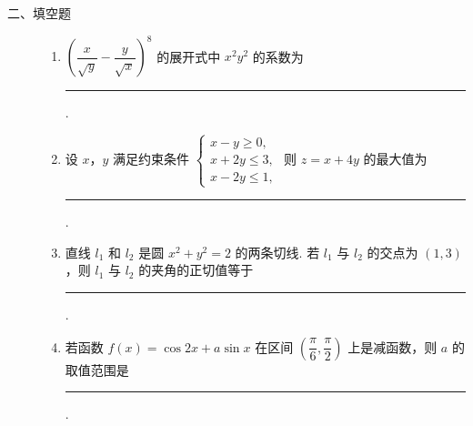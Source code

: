 \begin{description}

    \item[二、填空题]

    \begin{enumerate}[leftmargin=5pt]

      \addtocounter{enumi}{+12}

        \item \(\left(\dfrac{x}{\sqrt{y}}-\dfrac{y}{\sqrt{x}}\right)^{8}\) 的展开式中 \(x^{2}y^{2}\) 的系数为\rule[-0.3ex]{3em}{0.4pt}.

        \item 设 \(x\)，\(y\) 满足约束条件 \(\begin{cases}
x-y\geqslant 0,\\
x+2y\leqslant 3,\\
x-2y\leqslant 1,
\end{cases}\) 则 \(z=x+4y\) 的最大值为\rule[-0.3ex]{3em}{0.4pt}.

        \item 直线 \(l_{1}\) 和 \(l_{2}\) 是圆 \(x^{2}+y^{2}=2\) 的两条切线. 若 \(l_{1}\) 与 \(l_{2}\) 的交点为 \(\left(1,3\right)\)，则 \(l_{1}\) 与 \(l_{2}\) 的夹角的正切值等于\rule[-0.3ex]{3em}{0.4pt}.

        \item 若函数 \(f(x)=\cos 2x+a\sin x\) 在区间 \(\left(\dfrac{\pi}{6},\dfrac{\pi}{2}\right)\) 上是减函数，则 \(a\) 的取值范围是\rule[-0.3ex]{3em}{0.4pt}.

    \end{enumerate}

\end{description}

